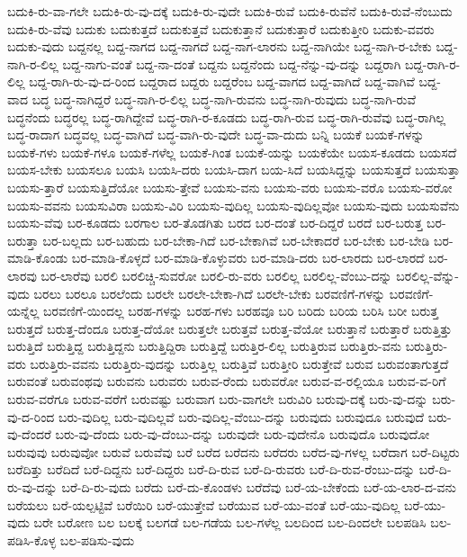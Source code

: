 {ಬದುಕಿ-ರು-ವಾ-ಗಲೇ
ಬದುಕಿ-ರು-ವು-ದಕ್ಕೆ
ಬದುಕಿ-ರು-ವುದೇ
ಬದುಕಿ-ರುವೆ
ಬದುಕಿ-ರುವೆನೆ
ಬದುಕಿ-ರುವೆ-ನೆಂಬುದು
ಬದುಕಿ-ರು-ವೆವು
ಬದುಕು
ಬದುಕುತ್ತದೆ
ಬದುಕುತ್ತವೆ
ಬದುಕುತ್ತಾನೆ
ಬದುಕುತ್ತಾರೆ
ಬದುಕುತ್ತೀರಿ
ಬದುಕು-ವವರು
ಬದುಕು-ವುದು
ಬದ್ದನಲ್ಲ
ಬದ್ದ-ನಾಗದ
ಬದ್ದ-ನಾಗದೆ
ಬದ್ದ-ನಾಗ-ಲಾರನು
ಬದ್ದ-ನಾಗಿಯೇ
ಬದ್ದ-ನಾಗಿ-ರ-ಬೇಕು
ಬದ್ದ-ನಾಗಿ-ರ-ಲಿಲ್ಲ
ಬದ್ದ-ನಾಗು-ವಂತೆ
ಬದ್ದ-ನಾ-ದಂತೆ
ಬದ್ದನು
ಬದ್ದನೆಂದು
ಬದ್ದ-ನೆನ್ನು-ವು-ದನ್ನು
ಬದ್ದರಾಗಿ
ಬದ್ದ-ರಾಗಿ-ರ-ಲಿಲ್ಲ
ಬದ್ದ-ರಾಗಿ-ರು-ವು-ದ-ರಿಂದ
ಬದ್ದರಾದ
ಬದ್ದರು
ಬದ್ದರೆಂಬ
ಬದ್ದ-ವಾಗದ
ಬದ್ದ-ವಾಗಿದೆ
ಬದ್ದ-ವಾಗಿವೆ
ಬದ್ದ-ವಾದ
ಬದ್ಧ
ಬದ್ಧ-ನಾಗಿದ್ದರೆ
ಬದ್ಧ-ನಾಗಿ-ರ-ಲಿಲ್ಲ
ಬದ್ಧ-ನಾಗಿ-ರುವನು
ಬದ್ಧ-ನಾಗಿ-ರುವುದು
ಬದ್ಧ-ನಾಗಿ-ರುವೆ
ಬದ್ಧನೆಂದು
ಬದ್ಧರಲ್ಲ
ಬದ್ಧ-ರಾಗಿದ್ದೇವೆ
ಬದ್ಧ-ರಾಗಿ-ರ-ಕೂಡದು
ಬದ್ಧ-ರಾಗಿ-ರುವ
ಬದ್ಧ-ರಾಗಿ-ರುವೆವು
ಬದ್ಧ-ರಾಗಿಲ್ಲ
ಬದ್ಧ-ರಾದಾಗ
ಬದ್ಧವಲ್ಲ
ಬದ್ಧ-ವಾಗಿದೆ
ಬದ್ಧ-ವಾಗಿ-ರು-ವುದೇ
ಬದ್ಧ-ವಾ-ದುದು
ಬನ್ನಿ
ಬಯಕೆ
ಬಯಕೆ-ಗಳನ್ನು
ಬಯಕೆ-ಗಳು
ಬಯಕೆ-ಗಳೂ
ಬಯಕೆ-ಗಳೆಲ್ಲ
ಬಯಕೆ-ಗಿಂತ
ಬಯಕೆ-ಯನ್ನು
ಬಯಕೆಯೇ
ಬಯಸ-ಕೂಡದು
ಬಯಸದೆ
ಬಯಸ-ಬೇಕು
ಬಯಸಲೂ
ಬಯಸಿ
ಬಯಸಿ-ದರು
ಬಯಸಿ-ದಾಗ
ಬಯ-ಸಿದೆ
ಬಯಸಿದ್ದನ್ನು
ಬಯಸುತ್ತದೆ
ಬಯಸುತ್ತಾ
ಬಯಸು-ತ್ತಾರೆ
ಬಯಸುತ್ತಿದೆಯೋ
ಬಯಸು-ತ್ತೇವೆ
ಬಯಸು-ವನು
ಬಯಸು-ವರು
ಬಯಸು-ವರೊ
ಬಯಸು-ವರೋ
ಬಯಸು-ವವನು
ಬಯಸುವಿರಾ
ಬಯಸು-ವಿರಿ
ಬಯಸು-ವುದಿಲ್ಲ
ಬಯಸು-ವುದಿಲ್ಲವೋ
ಬಯಸು-ವುದು
ಬಯಸುವೆನು
ಬಯಸು-ವೆವು
ಬರ-ಕೂಡದು
ಬರಗಾಲ
ಬರ-ತೊಡಗಿತು
ಬರದ
ಬರ-ದಂತೆ
ಬರ-ದಿದ್ದರೆ
ಬರದೆ
ಬರ-ಬರುತ್ತ
ಬರ-ಬರುತ್ತಾ
ಬರ-ಬಲ್ಲದು
ಬರ-ಬಹುದು
ಬರ-ಬೇಕಾ-ಗಿದೆ
ಬರ-ಬೇಕಾಗಿವೆ
ಬರ-ಬೇಕಾದರೆ
ಬರ-ಬೇಕು
ಬರ-ಬೇಡಿ
ಬರ-ಮಾಡಿ-ಕೊಂಡು
ಬರ-ಮಾಡಿ-ಕೊಳ್ಳದೆ
ಬರ-ಮಾಡಿ-ಕೊಳ್ಳುವರು
ಬರ-ಮಾಡಿ-ದರು
ಬರ-ಲಾರದು
ಬರ-ಲಾರದೆ
ಬರ-ಲಾರವು
ಬರ-ಲಾರೆವು
ಬರಲಿ
ಬರಲಿಚ್ಚಿ-ಸುವರೋ
ಬರಲಿ-ರು-ವರು
ಬರಲಿಲ್ಲ
ಬರಲಿಲ್ಲ-ವೆಂಬು-ದನ್ನು
ಬರಲಿಲ್ಲ-ವೆನ್ನು-ವುದು
ಬರಲು
ಬರಲೂ
ಬರಲೆಂದು
ಬರಲೇ
ಬರಲೇ-ಬೇಕಾ-ಗಿದೆ
ಬರಲೇ-ಬೇಕು
ಬರವಣಿಗೆ-ಗಳನ್ನು
ಬರವಣಿಗೆ-ಯನ್ನೆಲ್ಲ
ಬರವಣಿಗೆ-ಯಿಂದಲ್ಲ
ಬರಹ-ಗಳನ್ನು
ಬರಹ-ಗಳು
ಬರಹವೂ
ಬರಿ
ಬರಿದು
ಬರಿಯ
ಬರಿಸಿ
ಬರೀ
ಬರುತ್ತ
ಬರುತ್ತದೆ
ಬರುತ್ತ-ದೆಂದೂ
ಬರುತ್ತ-ದೆಯೋ
ಬರುತ್ತಲೇ
ಬರುತ್ತವೆ
ಬರುತ್ತ-ವೆಯೋ
ಬರುತ್ತಾನೆ
ಬರುತ್ತಾರೆ
ಬರುತ್ತಿತ್ತು
ಬರುತ್ತಿದೆ
ಬರುತ್ತಿದ್ದ
ಬರುತ್ತಿದ್ದನು
ಬರುತ್ತಿದ್ದಿರಾ
ಬರುತ್ತಿದ್ದೆ
ಬರುತ್ತಿರ-ಲಿಲ್ಲ
ಬರುತ್ತಿರುವ
ಬರುತ್ತಿರು-ವನು
ಬರುತ್ತಿರು-ವರು
ಬರುತ್ತಿರು-ವವನು
ಬರುತ್ತಿರು-ವುದನ್ನು
ಬರುತ್ತಿಲ್ಲ
ಬರುತ್ತಿವೆ
ಬರುತ್ತೀರಿ
ಬರುತ್ತೇವೆ
ಬರುವ
ಬರುವಂತಾಗುತ್ತದೆ
ಬರುವಂತೆ
ಬರುವಂಥವು
ಬರುವನು
ಬರುವರು
ಬರುವ-ರೆಂದು
ಬರುವರೋ
ಬರುವ-ವ-ರಲ್ಲಿಯೂ
ಬರುವ-ವ-ರಿಗೆ
ಬರುವ-ವರೆಗೂ
ಬರುವ-ವರೆಗೆ
ಬರುವಷ್ಟು
ಬರುವಾಗ
ಬರು-ವಾಗಲೇ
ಬರುವಿರಿ
ಬರುವು-ದಕ್ಕೆ
ಬರು-ವು-ದನ್ನು
ಬರು-ವು-ದ-ರಿಂದ
ಬರು-ವುದಿಲ್ಲ
ಬರು-ವುದಿಲ್ಲವೆ
ಬರು-ವುದಿಲ್ಲ-ವೆಂಬು-ದನ್ನು
ಬರುವುದು
ಬರುವುದೂ
ಬರುವುದೆ
ಬರು-ವು-ದೆಂದರೆ
ಬರು-ವು-ದೆಂದು
ಬರು-ವು-ದೆಂಬು-ದನ್ನು
ಬರುವುದೇ
ಬರು-ವುದೇನೊ
ಬರುವುದೊ
ಬರುವುದೋ
ಬರುವುವು
ಬರುವುವೋ
ಬರುವೆ
ಬರುವೆವು
ಬರೆ
ಬರೆದ
ಬರೆದನು
ಬರೆದರು
ಬರೆದ-ವು-ಗಳಲ್ಲ
ಬರೆದಾಗ
ಬರೆ-ದಿಟ್ಟರು
ಬರೆದಿತ್ತು
ಬರೆದಿದೆ
ಬರೆ-ದಿದ್ದನು
ಬರೆ-ದಿದ್ದರು
ಬರೆ-ದಿ-ರುವ
ಬರೆ-ದಿ-ರುವರು
ಬರೆ-ದಿ-ರುವ-ರೆಂಬು-ದನ್ನು
ಬರೆ-ದಿ-ರು-ವು-ದನ್ನು
ಬರೆ-ದಿ-ರು-ವುದು
ಬರೆದು
ಬರೆ-ದು-ಕೊಂಡಳು
ಬರೆದೆವು
ಬರೆ-ಯ-ಬೇಕೆಂದು
ಬರೆ-ಯ-ಲಾರ-ದ-ವನು
ಬರೆಯಲು
ಬರೆ-ಯಲ್ಪಟ್ಟಿವೆ
ಬರೆಯಿರಿ
ಬರೆ-ಯುತ್ತೇವೆ
ಬರೆಯುವ
ಬರೆ-ಯು-ವಂತೆ
ಬರೆ-ಯು-ವುದಿಲ್ಲ
ಬರೆ-ಯು-ವುದು
ಬರೇ
ಬರೋಣ
ಬಲ
ಬಲಕ್ಕೆ
ಬಲಗಡೆ
ಬಲ-ಗಡೆಯ
ಬಲ-ಗಳೆಲ್ಲ
ಬಲದಿಂದ
ಬಲ-ದಿಂದಲೇ
ಬಲಪಡಿಸಿ
ಬಲ-ಪಡಿಸಿ-ಕೊಳ್ಳ
ಬಲ-ಪಡಿಸು-ವುದು
}
